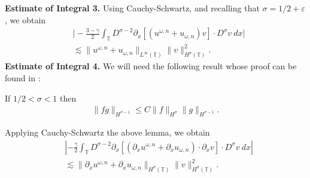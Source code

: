 \documentclass{beamer}
\newcommand{\p}{\partial}
\newcommand{\ci}{\mathbb{T}}
\newcommand{\ee}{\varepsilon}
\begin{document}
\begin{frame}
	\frametitle{}
{\bf Estimate of Integral 3.} Using Cauchy-Schwartz, and recalling that
$\sigma = 1/2 + \ee$,  we obtain
%
%
\begin{equation*}
\begin{split}
& \bigg | -\frac{3-\gamma}{2} \int_{\ci} D^{\sigma -2} \p_x \left[
(u^{\omega,n} + u_{\omega,n})v \right]
\cdot D^\sigma v \ dx \bigg |
\\
& \lesssim \|u^{\omega,n} + u_{\omega,n} \|_{L^\infty(\ci)} 
\|v\|_{H^\sigma(\ci)}^2.
\label{9}
\end{split}
\end{equation*}
%
%
%
\pause
{\bf Estimate of Integral 4.}
We will need the following result whose proof can be found in 
\cite{Himonas_2009_Non-uniform-dep-per}:
%
%
%
\begin{lemma}
\label{impo}
If  $1/2 < \sigma < 1 $ then
%
%
\begin{equation*}
\begin{split}
\|fg\|_{H^{\sigma - 1}} \le C \|f\|_{H^{\sigma}}
\|g\|_{H^{\sigma -1}}.
\label{11}
\end{split}
\end{equation*}
%
%
\end{lemma}
%
\pause
Applying Cauchy-Schwartz the above lemma, we obtain
%
%
\begin{equation*}
\begin{split}
& \left | -\frac{\gamma}{2} \int_{\ci} D^{\sigma -2 } \p_x \left[
\left( \p_x u^{\omega,n} + \p_x u_{\omega,n} \right) \cdot \p_x v
\right] \cdot D^\sigma v \ dx \right |
\\
& \lesssim \|\p_x u^{\omega,n} + \p_x u_{\omega,n}
\|_{H^\sigma(\ci)} \|v\|_{H^\sigma(\ci)}^2.
\label{12}
\end{split}
\end{equation*}
%
%
\end{frame}
%
%
\end{document}
